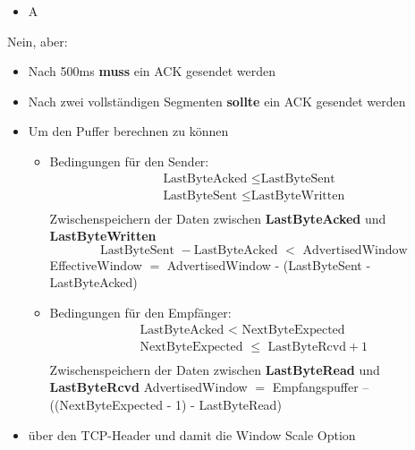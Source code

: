 
\begin{itemize}
    \item \todo A
\end{itemize}

Nein, aber:
\begin{itemize}
    \item Nach 500ms \textbf{muss} ein ACK gesendet werden
    \item Nach zwei vollständigen Segmenten \textbf{sollte} ein ACK gesendet werden
\end{itemize}

\begin{itemize}
    \item Um den Puffer berechnen zu können
    \begin{itemize}
        \item Bedingungen für den Sender:
        \begin{gather*}
            \text{LastByteAcked }\leq \text{LastByteSent}\\
            \text{LastByteSent }\leq \text{LastByteWritten}\\
        \end{gather*}
        Zwischenspeichern der Daten zwischen \textbf{LastByteAcked} und \textbf{LastByteWritten}
        \[\text{LastByteSent }- \text{LastByteAcked }< \text{ AdvertisedWindow}\]
        EffectiveWindow $=$ AdvertisedWindow - (LastByteSent - LastByteAcked)
        \item Bedingungen für den Empfänger:
        \begin{gather*}
            \text{LastByteAcked }<\text{ NextByteExpected}\\
            \text{NextByteExpected }\leq \text{ LastByteRcvd} + 1\\
        \end{gather*}
        Zwischenspeichern der Daten zwischen \textbf{LastByteRead} und \textbf{LastByteRcvd}
        AdvertisedWindow $=$ Empfangspuffer – ((NextByteExpected - 1) - LastByteRead)
    \end{itemize}
    \item über den TCP-Header und damit die Window Scale Option
\end{itemize}

